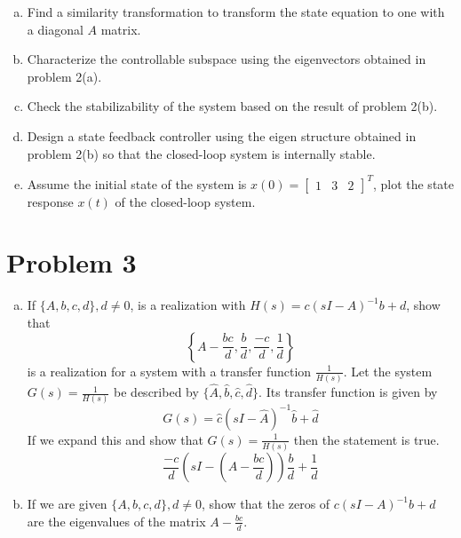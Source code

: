\documentclass{article}
\begin{document}
\begin{enumerate}[(a)]
\item Find a similarity transformation to transform the state equation to one with a diagonal $A$ matrix.
\newline
\newline

\item Characterize the controllable subspace using the eigenvectors obtained in problem 2(a).
\newline
\newline

\item Check the stabilizability of the system based on the result of problem 2(b).
\newline
\newline

\item Design a state feedback controller using the eigen structure obtained in problem 2(b) so that the closed-loop system is internally stable.
\newline
\newline

\item Assume the initial state of the system is $x(0) = \begin{bmatrix} 1 & 3 & 2\end{bmatrix}^T$, plot the state response $x(t)$ of the closed-loop system.
\newline
\newline

\end{enumerate}


\section*{Problem 3}
\begin{enumerate}[(a)]
\item If $\{A, b, c, d\}, d \neq 0$, is a realization with $H(s) = c(sI-A)^{-1}b +d$, show that
$$ \left\{ A - \frac{bc}{d}, \frac{b}{d}, \frac{-c}{d}, \frac{1}{d} \right\} $$
is a realization for a system with a transfer function $\frac{1}{H(s)}$.
\newline
\newline
Let the system $G(s) = \frac{1}{H(s)}$ be described by $\{\hat{A}, \hat{b}, \hat{c}, \hat{d}\}$.
Its transfer function is given by
$$
G(s) = \hat{c}(sI-\hat{A})^{-1}\hat{b}+\hat{d}
$$
If we expand this and show that $G(s) = \frac{1}{H(s)}$ then the statement is true.
$$\frac{-c}{d} (sI - (A - \frac{bc}{d}))\frac{b}{d} + \frac{1}{d}$$

\item If we are given $\{A, b, c, d\}, d \neq 0$, show that the zeros of $c(sI-A)^{-1}b + d$ are the eigenvalues of the matrix $ A - \frac{bc}{d}$.
\newline
\newline

\end{enumerate}
\end{document}
